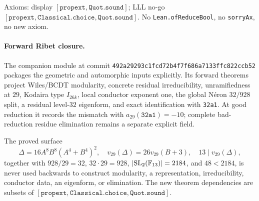 Axioms: display $[\mathtt{propext},\mathtt{Quot.sound}]$;
LLL no-go
$[\mathtt{propext},\mathtt{Classical.choice},\mathtt{Quot.sound}]$.
No \texttt{Lean.ofReduceBool}, no \texttt{sorryAx}, no new axiom.

\paragraph{Forward Ribet closure.}
The companion module  at commit
\texttt{492a29293c1fcd72b4f7f686a7133ffc822ccb52} packages the geometric
and automorphic inputs explicitly. Its forward theorems project Wiles/BCDT
modularity, concrete residual irreducibility, unramifiedness at $29$,
Kodaira type $I_{26k}$, local conductor exponent one, the global N\'eron
$32/928$ split, a residual level-$32$ eigenform, and exact identification
with \texttt{32a1}. At good reduction it records the mismatch with
$a_{29}(\texttt{32a1})=-10$; complete bad-reduction residue elimination
remains a separate explicit field.

The proved surface
\[
 \Delta=16A^8B^8(A^4+B^4)^2,\quad
 v_{29}(\Delta)=26v_{29}(B+3),\quad 13\mid v_{29}(\Delta),
\]
together with $928/29=32$, $32\cdot29=928$,
$\lvert\mathrm{SL}_2(\mathbb{F}_{13})\rvert=2184$, and $48<2184$, is never used backwards
to construct modularity, a representation, irreducibility, conductor data,
an eigenform, or elimination. The new theorem dependencies are subsets of
$[\mathtt{propext},\mathtt{Classical.choice},\mathtt{Quot.sound}]$.
